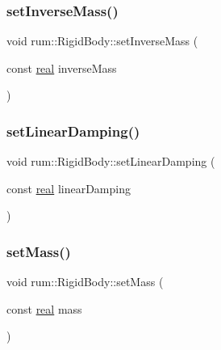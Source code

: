 \mbox{\label{classrum_1_1_rigid_body_a3fb4c29e486be6984d0f7a21a7bede06}} 
\subsubsection{\texorpdfstring{set\+Inverse\+Mass()}{setInverseMass()}}
{\footnotesize\ttfamily void rum\+::\+Rigid\+Body\+::set\+Inverse\+Mass (\begin{DoxyParamCaption}\item[{const \hyperlink{namespacerum_a7e8cca23573d5eaead0f138cbaa4862c}{real}}]{inverse\+Mass }\end{DoxyParamCaption})}

\mbox{\label{classrum_1_1_rigid_body_ac7afc4f115c4a387aa9e6929c9d7a40c}} 
\subsubsection{\texorpdfstring{set\+Linear\+Damping()}{setLinearDamping()}}
{\footnotesize\ttfamily void rum\+::\+Rigid\+Body\+::set\+Linear\+Damping (\begin{DoxyParamCaption}\item[{const \hyperlink{namespacerum_a7e8cca23573d5eaead0f138cbaa4862c}{real}}]{linear\+Damping }\end{DoxyParamCaption})}

\mbox{\label{classrum_1_1_rigid_body_ac71fd21db22c1a36a32c03d342dd6dbe}} 
\subsubsection{\texorpdfstring{set\+Mass()}{setMass()}}
{\footnotesize\ttfamily void rum\+::\+Rigid\+Body\+::set\+Mass (\begin{DoxyParamCaption}\item[{const \hyperlink{namespacerum_a7e8cca23573d5eaead0f138cbaa4862c}{real}}]{mass }\end{DoxyParamCaption})}

